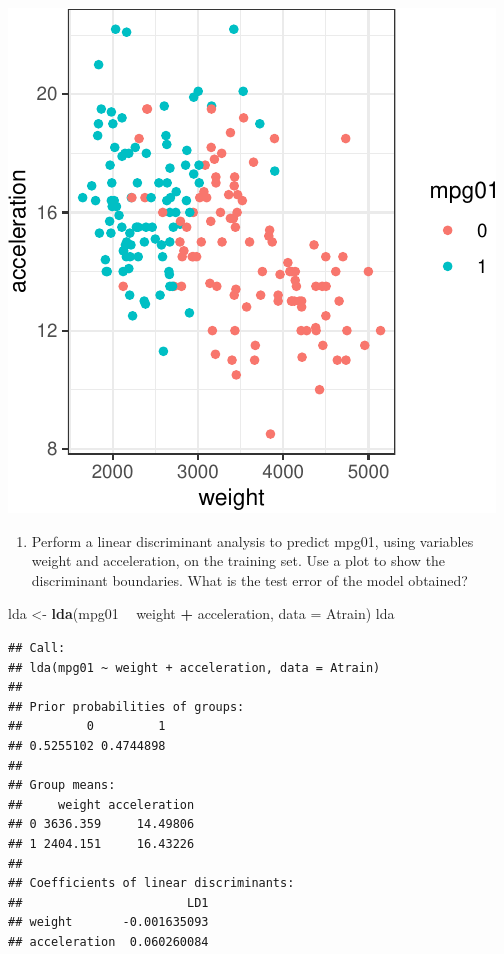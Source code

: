 \documentclass[]{article}
\newenvironment{Shaded}{\begin{snugshade}}{\end{snugshade}}
\newcommand{\DataTypeTok}[1]{\textcolor[rgb]{0.13,0.29,0.53}{#1}}
\newcommand{\KeywordTok}[1]{\textcolor[rgb]{0.13,0.29,0.53}{\textbf{#1}}}
\newcommand{\NormalTok}[1]{#1}
\newcommand{\OperatorTok}[1]{\textcolor[rgb]{0.81,0.36,0.00}{\textbf{#1}}}
\newcommand{\StringTok}[1]{\textcolor[rgb]{0.31,0.60,0.02}{#1}}
\providecommand{\tightlist}{%
  \setlength{\itemsep}{0pt}\setlength{\parskip}{0pt}}
\begin{document}
\begin{center}\includegraphics{sol_A3_files/figure-latex/unnamed-chunk-8-1} \end{center}

\begin{enumerate}
\def\labelenumi{(\alph{enumi})}
\setcounter{enumi}{1}
\tightlist
\item
  Perform a linear discriminant analysis to predict mpg01, using
  variables weight and acceleration, on the training set. Use a plot to
  show the discriminant boundaries. What is the test error of the model
  obtained?
\end{enumerate}

\begin{Shaded}
\begin{Highlighting}[]
\NormalTok{lda <-}\StringTok{ }\KeywordTok{lda}\NormalTok{(mpg01 }\OperatorTok{~}\StringTok{ }\NormalTok{weight }\OperatorTok{+}\StringTok{ }\NormalTok{acceleration, }\DataTypeTok{data =}\NormalTok{ Atrain)}
\NormalTok{lda}
\end{Highlighting}
\end{Shaded}

\begin{verbatim}
## Call:
## lda(mpg01 ~ weight + acceleration, data = Atrain)
## 
## Prior probabilities of groups:
##         0         1 
## 0.5255102 0.4744898 
## 
## Group means:
##     weight acceleration
## 0 3636.359     14.49806
## 1 2404.151     16.43226
## 
## Coefficients of linear discriminants:
##                       LD1
## weight       -0.001635093
## acceleration  0.060260084
\end{verbatim}
\end{document}
